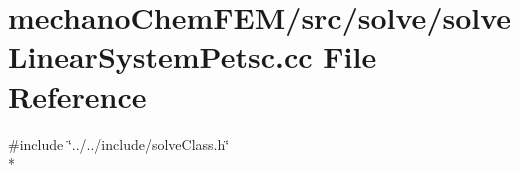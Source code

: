 \section{mechano\-Chem\-F\-E\-M/src/solve/solve\-Linear\-System\-Petsc.cc File Reference}
\label{solve_linear_system_petsc_8cc}
{\ttfamily \#include \char`\"{}../../include/solve\-Class.\-h\char`\"{}}\\*
